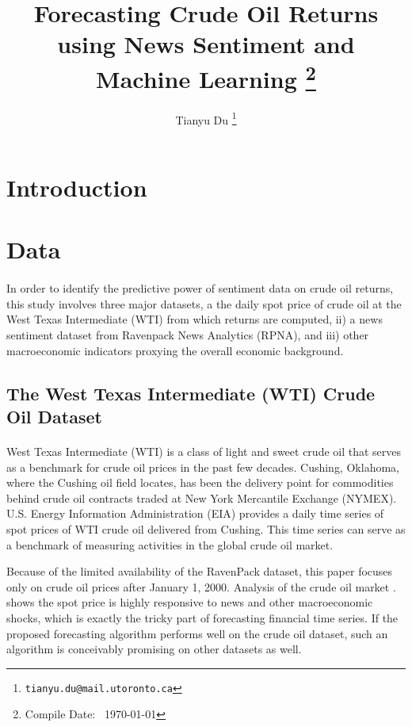 \documentclass[12pt]{article}
\title{Forecasting Crude Oil Returns using News Sentiment and Machine Learning \footnote{Compile Date: \currenttime\ \today}}
\author{Tianyu Du \footnote{\texttt{tianyu.du@mail.utoronto.ca}}}
\begin{document}
	\maketitle
	\tableofcontents
	\newpage
	\section{Introduction}
	
	\section{Data}
	\lipsum[11]
	\paragraph{}In order to identify the predictive power of sentiment data on crude oil returns, this study involves three major datasets, a the daily spot price of crude oil at the West Texas Intermediate (WTI) from which returns are computed, ii) a news sentiment dataset from Ravenpack News Analytics (RPNA), and iii) other macroeconomic indicators proxying the overall economic background.

	\subsection{The West Texas Intermediate (WTI) Crude Oil Dataset}
	\paragraph{}West Texas Intermediate (WTI) is a class of light and sweet crude oil that serves as a benchmark for crude oil prices in the past few decades. Cushing, Oklahoma, where the Cushing oil field locates, has been the delivery point for commodities behind crude oil contracts traded at New York Mercantile Exchange (NYMEX). U.S. Energy Information Administration (EIA) provides a daily time series of spot prices of WTI crude oil delivered from Cushing. This time series can serve as a benchmark of measuring activities in the global crude oil market. 
	
	\par Because of the limited availability of the RavenPack dataset, this paper focuses only on crude oil prices after January 1, 2000. Analysis of the crude oil market \cite{kilian2016}. shows the spot price is highly responsive to news and other macroeconomic shocks, which is exactly the tricky part of forecasting financial time series. If the proposed forecasting algorithm performs well on the crude oil dataset, such an algorithm is conceivably promising on other datasets as well.
	
\end{document}
